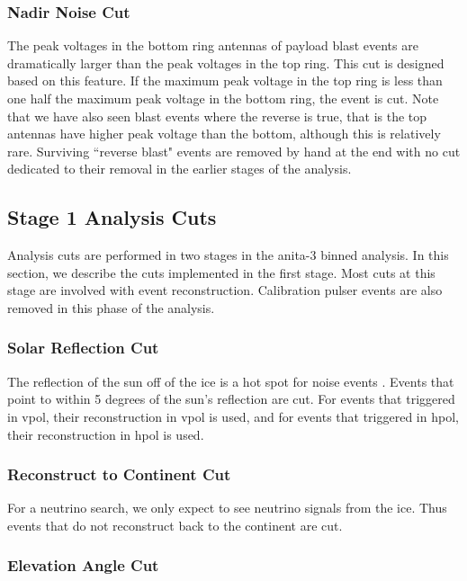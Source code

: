 \subsubsection{Nadir Noise Cut}

The peak voltages in the bottom ring antennas of payload blast events are dramatically larger than the peak voltages in the top ring. This cut is designed based on this feature.  
If the maximum peak voltage in the top ring is less than one half the maximum peak voltage in the bottom ring, the event is cut. Note that we have also seen blast events where the reverse is true, that is the top antennas have higher peak voltage than the bottom, although this is relatively rare. Surviving ``reverse blast" events are removed by hand at the end with no cut dedicated to their removal in the earlier stages of the analysis. 

\subsection{Stage 1 Analysis Cuts}

Analysis cuts are performed in two stages in the \gls{anita}-3 binned analysis. In this section, we describe the cuts implemented in the first stage. Most cuts at this stage are involved with event reconstruction. Calibration pulser events are also removed in this phase of the analysis. 

\subsubsection{Solar Reflection Cut}

The reflection of the sun off of the ice is a hot spot for noise events \cite{samStaffordThesis}.  Events that point to within 5 degrees of the sun's reflection are cut. For events that triggered in \gls{vpol}, their reconstruction in \gls{vpol} is used, and for events that triggered in \gls{hpol}, their reconstruction in \gls{hpol} is used. 

\subsubsection{Reconstruct to Continent Cut}

For a neutrino search, we only expect to see neutrino signals from the ice.  Thus events that do not reconstruct back to the continent are cut. 

\subsubsection{Elevation Angle Cut}


